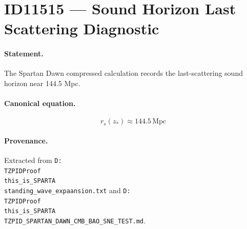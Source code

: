 \section*{ID11515 --- Sound Horizon Last Scattering Diagnostic}

\paragraph{Statement.}
The Spartan Dawn compressed calculation records the last-scattering sound horizon near 144.5 Mpc.

\paragraph{Canonical equation.}
\[
r_s(z_*)\approx144.5\,\mathrm{Mpc}
\]

\paragraph{Provenance.}
Extracted from \texttt{D:\\TZPIDProof\\this\_is\_SPARTA\\standing\_wave\_expaansion.txt} and \texttt{D:\\TZPIDProof\\this\_is\_SPARTA\\TZPID\_SPARTAN\_DAWN\_CMB\_BAO\_SNE\_TEST.md}.
